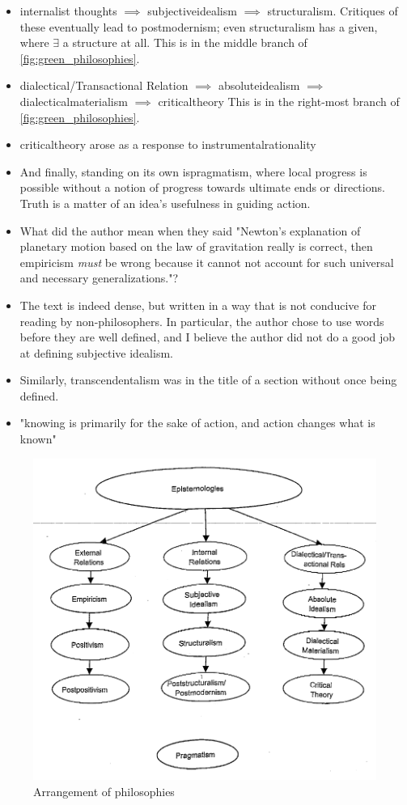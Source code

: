 \documentclass{TC}
\begin{document}
\begin{itemize}
		\item \Gls{internalist} thoughts $\implies$ \gls{subjectiveidealism} $\implies$ \gls{structuralism}. Critiques of these eventually lead to \gls{postmodernism}; even structuralism has a given, where $\exists$ a structure at all. This is in the middle branch of \autoref{fig:green_philosophies}.
		\item \Gls{dialectic}al/Transactional Relation $\implies$ \gls{absoluteidealism} $\implies$ \gls{dialecticalmaterialism} $\implies$ \gls{criticaltheory} This is in the right-most branch of \autoref{fig:green_philosophies}.
		\item \Gls{criticaltheory} arose as a response to \gls{instrumentalrationality}
		\item And finally, standing on its own is\gls{pragmatism}, where local progress is possible without a notion of progress towards ultimate ends or directions. Truth is a matter of an idea's usefulness in guiding action. 
	\end{itemize}
	
	\begin{itemize}[(???)]
		\item What did the author mean when they said "Newton's explanation of planetary motion based on the law of gravitation really is correct, then empiricism \emph{must} be wrong because it cannot not account for such universal and necessary generalizations."?
	\end{itemize}
	\begin{itemize}[(!!!)]
	\item The text is indeed dense, but written in a way that is not conducive for reading by non-philosophers. In particular, the author chose to use words before they are well defined, and I believe the author did not do a good job at defining subjective idealism. 
	
	\item Similarly, transcendentalism was in the title of a section without once being defined.
	\item "knowing is primarily for the sake of action, and action changes what is known"
	\end{itemize}

\begin{figure}[H]
\centering
\includegraphics[width=.7\textwidth]{bredo_philosophies.png}
\caption{Arrangement of philosophies \parencite{green_philosophies_2006}}
\label{fig:green_philosophies}
\end{figure}
	
	
\end{document}
